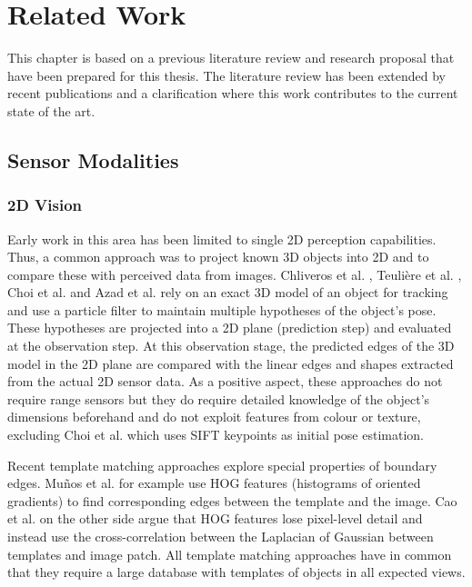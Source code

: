 \chapter{Related Work}
\label{sec:related_work}

This chapter is based on a previous literature review and research proposal that have been prepared for this thesis. The literature review has been extended by recent publications and a clarification where this work contributes to the current state of the art.


\section{Sensor Modalities}

\subsection{2D Vision}
Early work in this area has been limited to single 2D perception capabilities. Thus, a common approach was to project known 3D objects into 2D and to compare these with perceived data from images. Chliveros et al. \cite{Chliveros2013}, Teuli\`ere et al. \cite{Teuliere2010}, Choi et al. \cite{Choi2012} and Azad et al. \cite{Azad2011} rely on an exact 3D model of an object for tracking and use a particle filter to maintain multiple hypotheses of the object's pose. These hypotheses are projected into a 2D plane (prediction step) and evaluated at the observation step. At this observation stage, the predicted edges of the 3D model in the 2D plane are compared with the linear edges and shapes extracted from the actual 2D sensor data. As a positive aspect, these approaches do not require range sensors but they do require detailed knowledge of the object's dimensions beforehand and do not exploit features from colour or texture, excluding Choi et al. which uses SIFT keypoints as initial pose estimation.

Recent template matching approaches explore special properties of boundary edges. Mu\~nos et al. \cite{Munoz2016} for example use HOG features (histograms of oriented gradients) to find corresponding edges between the template and the image. Cao et al. \cite{Cao2016} on the other side argue that HOG features lose pixel-level detail and instead use the cross-correlation between the Laplacian of Gaussian between templates and image patch. All template matching approaches have in common that they require a large database with templates of objects in all expected views.

